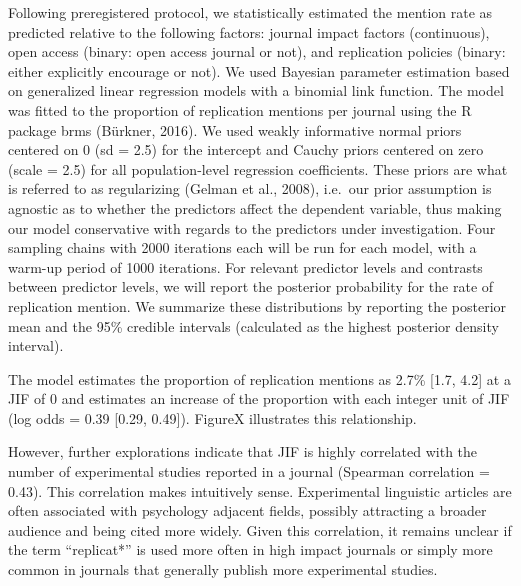 \documentclass[]{elsarticle} %
\begin{document}
Following preregistered protocol, we statistically estimated the mention
rate as predicted relative to the following factors: journal impact
factors (continuous), open access (binary: open access journal or not),
and replication policies (binary: either explicitly encourage or not).
We used Bayesian parameter estimation based on generalized linear
regression models with a binomial link function. The model was fitted to
the proportion of replication mentions per journal using the R package
brms (Bürkner, 2016). We used weakly informative normal priors centered
on 0 (sd = 2.5) for the intercept and Cauchy priors centered on zero
(scale = 2.5) for all population-level regression coefficients. These
priors are what is referred to as regularizing (Gelman et al., 2008),
i.e.~our prior assumption is agnostic as to whether the predictors
affect the dependent variable, thus making our model conservative with
regards to the predictors under investigation. Four sampling chains with
2000 iterations each will be run for each model, with a warm-up period
of 1000 iterations. For relevant predictor levels and contrasts between
predictor levels, we will report the posterior probability for the rate
of replication mention. We summarize these distributions by reporting
the posterior mean and the 95\% credible intervals (calculated as the
highest posterior density interval).

The model estimates the proportion of replication mentions as 2.7\%
{[}1.7, 4.2{]} at a JIF of 0 and estimates an increase of the proportion
with each integer unit of JIF (log odds = 0.39 {[}0.29, 0.49{]}).
FigureX illustrates this relationship.

However, further explorations indicate that JIF is highly correlated
with the number of experimental studies reported in a journal (Spearman
correlation = 0.43). This correlation makes intuitively sense.
Experimental linguistic articles are often associated with psychology
adjacent fields, possibly attracting a broader audience and being cited
more widely. Given this correlation, it remains unclear if the term
``replicat*'' is used more often in high impact journals or simply more
common in journals that generally publish more experimental studies.
\end{document}
